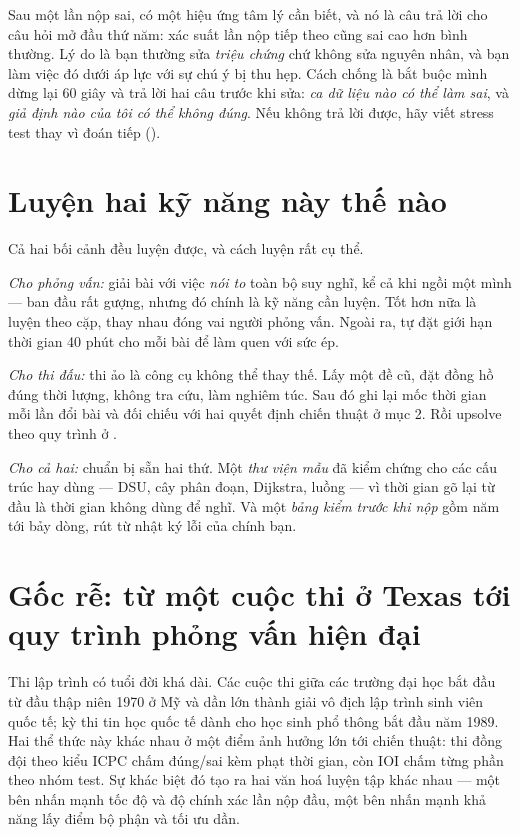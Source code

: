 \documentclass[../../algorithm.tex]{subfiles}
\begin{document}
Sau một lần nộp sai, có một hiệu ứng tâm lý cần biết, và nó là câu trả lời cho câu hỏi mở đầu thứ năm: xác suất lần nộp tiếp theo cũng sai cao hơn bình thường. Lý do là bạn thường sửa \emph{triệu chứng} chứ không sửa nguyên nhân, và bạn làm việc đó dưới áp lực với sự chú ý bị thu hẹp. Cách chống là bắt buộc mình dừng lại 60 giây và trả lời hai câu trước khi sửa: \emph{ca dữ liệu nào có thể làm sai}, và \emph{giả định nào của tôi có thể không đúng}. Nếu không trả lời được, hãy viết stress test thay vì đoán tiếp ().

\section{Luyện hai kỹ năng này thế nào}

Cả hai bối cảnh đều luyện được, và cách luyện rất cụ thể.

\emph{Cho phỏng vấn:} giải bài với việc \emph{nói to} toàn bộ suy nghĩ, kể cả khi ngồi một mình --- ban đầu rất gượng, nhưng đó chính là kỹ năng cần luyện. Tốt hơn nữa là luyện theo cặp, thay nhau đóng vai người phỏng vấn. Ngoài ra, tự đặt giới hạn thời gian 40 phút cho mỗi bài để làm quen với sức ép.

\emph{Cho thi đấu:} thi ảo là công cụ không thể thay thế. Lấy một đề cũ, đặt đồng hồ đúng thời lượng, không tra cứu, làm nghiêm túc. Sau đó ghi lại mốc thời gian mỗi lần đổi bài và đối chiếu với hai quyết định chiến thuật ở mục 2. Rồi upsolve theo quy trình ở .

\emph{Cho cả hai:} chuẩn bị sẵn hai thứ. Một \emph{thư viện mẫu} đã kiểm chứng cho các cấu trúc hay dùng --- DSU, cây phân đoạn, Dijkstra, luồng --- vì thời gian gõ lại từ đầu là thời gian không dùng để nghĩ. Và một \emph{bảng kiểm trước khi nộp} gồm năm tới bảy dòng, rút từ nhật ký lỗi của chính bạn.

\section{Gốc rễ: từ một cuộc thi ở Texas tới quy trình phỏng vấn hiện đại}

Thi lập trình có tuổi đời khá dài. Các cuộc thi giữa các trường đại học bắt đầu từ đầu thập niên 1970 ở Mỹ và dần lớn thành giải vô địch lập trình sinh viên quốc tế; kỳ thi tin học quốc tế dành cho học sinh phổ thông bắt đầu năm 1989. Hai thể thức này khác nhau ở một điểm ảnh hưởng lớn tới chiến thuật: thi đồng đội theo kiểu ICPC chấm đúng/sai kèm phạt thời gian, còn IOI chấm từng phần theo nhóm test. Sự khác biệt đó tạo ra hai văn hoá luyện tập khác nhau --- một bên nhấn mạnh tốc độ và độ chính xác lần nộp đầu, một bên nhấn mạnh khả năng lấy điểm bộ phận và tối ưu dần.
\end{document}
